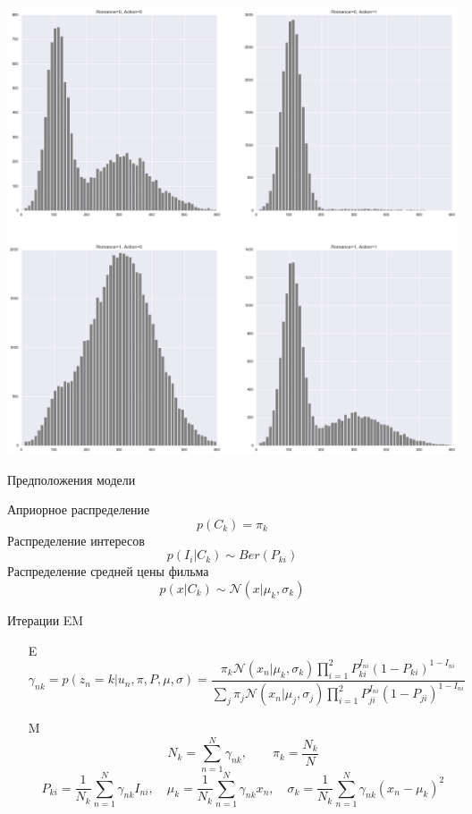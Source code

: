 \documentclass[aspectratio=169]{beamer}
\begin{document}
\begin{frame}{}

\begin{center}
\includegraphics[height=0.8\textheight]{images/movies.png}
\end{center}

\end{frame}

\begin{frame}{Предположения модели}

Априорное распределение
\[
p(C_k) = \pi_k
\]
Распределение интересов
\[
p(I_i | C_k) \sim Ber(P_{ki})
\]
Распределение средней цены фильма
\[
p(x | C_k) \sim \mathcal{N}(x | \mu_k, \sigma_k)
\]

\end{frame}

\begin{frame}{Итерации EM}

\begin{itemize}
\item[E]
\[
\gamma_{nk} = p(z_n = k | u_n, \pi, P, \mu, \sigma) = \frac{\pi_k \mathcal{N}(x_n | \mu_k, \sigma_k) \prod_{i=1}^2 P_{ki}^{I_{ni}}(1 - P_{ki})^{1 - I_{ni}}}{\sum_j \pi_j \mathcal{N}(x_n | \mu_j, \sigma_j) \prod_{i=1}^2 P_{ji}^{I_{ni}}(1 - P_{ji})^{1 - I_{ni}}}
\]
\item[M]
\[
N_k = \sum_{n=1}^N \gamma_{nk}, \qquad \pi_k = \frac{N_k}{N}
\]
\[
P_{ki} = \frac{1}{N_k} \sum_{n=1}^N \gamma_{nk} I_{ni}, \quad \mu_{k} = \frac{1}{N_k} \sum_{n=1}^N \gamma_{nk} x_n, \quad \sigma_k = \frac 1 {N_k} \sum_{n=1}^N \gamma_{nk} ({x}_n - \mu_k)^2
\]
\end{itemize}

\end{frame}
\end{document}
